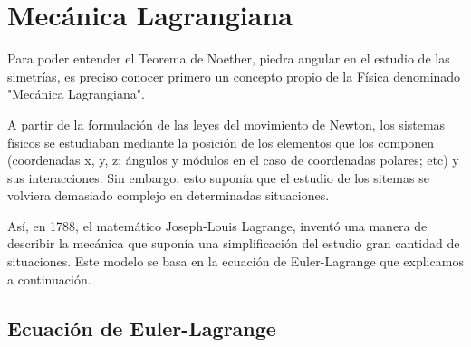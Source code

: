 \section{Mecánica Lagrangiana}
Para poder entender el Teorema de Noether, piedra angular en el estudio de las simetrías, es preciso conocer primero un concepto propio de la Física denominado "Mecánica Lagrangiana".

A partir de la formulación de las leyes del movimiento de Newton, los sistemas físicos se estudiaban mediante la posición de los elementos que los componen (coordenadas x, y, z; ángulos y módulos en el caso de coordenadas polares; etc) y sus interacciones. Sin embargo, esto suponía que el estudio de los sitemas se volviera demasiado complejo en determinadas situaciones.

Así, en 1788, el matemático Joseph-Louis Lagrange, inventó una manera de describir la mecánica que suponía una simplificación del estudio gran cantidad de situaciones. Este modelo se basa en la ecuación de Euler-Lagrange que explicamos a continuación.

\subsection{Ecuación de Euler-Lagrange}

